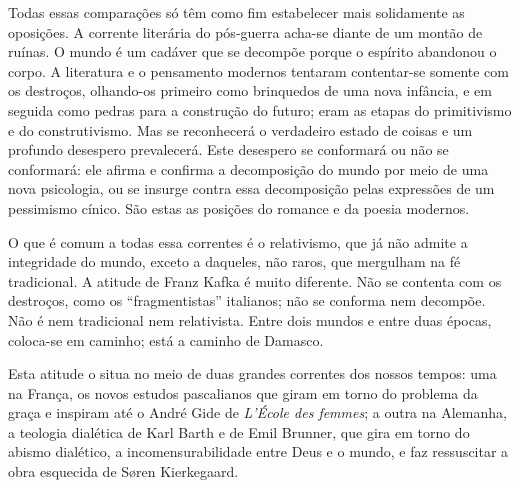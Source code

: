 Todas essas comparações só têm como fim estabelecer mais solidamente as oposições. A corrente literária do pós-guerra acha-se diante de um montão de 
ruínas. O mundo é um cadáver que se decompõe porque o espírito abandonou
o corpo. A literatura e o pensamento modernos tentaram contentar-se
somente com os destroços, olhando-os primeiro como brinquedos de uma
nova infância, e em seguida como pedras para a construção do futuro;
eram as etapas do primitivismo e do construtivismo. Mas se reconhecerá o
verdadeiro estado de coisas e um profundo desespero prevalecerá. Este
desespero se conformará ou não se conformará: ele afirma e confirma a
decomposição do mundo por meio de uma nova psicologia, ou se insurge
contra essa \mbox{decomposição} pelas expressões de um pessimismo cínico. São
estas as posições do romance e da poesia modernos.

O que é comum a todas
essa correntes é o relativismo, que já não admite a integridade do
mundo, exceto a daqueles, não raros, que mergulham na fé tradicional.
A atitude de Franz Kafka é muito diferente. Não se contenta com os
destroços, como os ``fragmentistas'' italianos; não se conforma nem
decompõe. Não é nem tradicional nem relativista. Entre dois mundos e
entre duas épocas, coloca-se em caminho; está a caminho de Damasco.

Esta atitude o situa no meio de duas grandes correntes dos nossos tempos: uma
na França, os novos estudos pascalianos que giram em torno do problema da
graça e inspiram até o André Gide de \textit{L'École des femmes}; a outra na
Alemanha, a teologia dialética de Karl Barth e de Emil Brunner,
que gira em torno do abismo dialético, a incomensurabilidade entre Deus
e o mundo, e faz ressuscitar a obra esquecida de Søren Kierkegaard.



